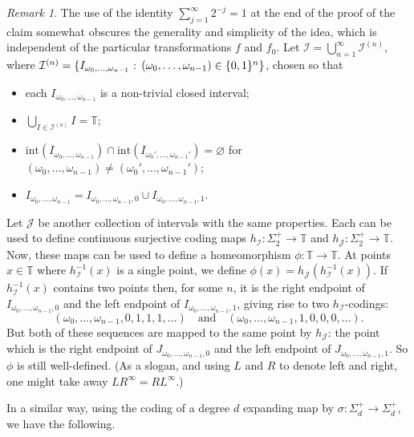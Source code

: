 \documentclass[12pt]{article}
\theoremstyle{definition}
\theoremstyle{remark}
\newtheorem{remark}[theorem]{Remark}
\begin{document}
\begin{remark}
The use of the identity $\sum_{j=1}^\infty 2^{-j} =1$ at the end of the proof of the claim somewhat obscures the generality and simplicity of the idea, which is independent of the particular transformations $f$ and $f_0$. Let $\mathcal I = \bigcup_{n=1}^\infty \mathcal I^{(n)}$, where
$\mathcal I^{(n)} = \{I_{\omega_0,\ldots,\omega_{n-1}} \hbox{ : } (\omega_0,\ldots,\omega_{n-1})
\in \{0,1\}^n\}$, chosen so that
\begin{itemize}
\item
each $I_{\omega_0,\ldots,\omega_{n-1}}$ is a non-trivial closed interval;
\item
$\bigcup_{I \in \mathcal I^{(n)}} I = \mathbb T$;
\item
$\mathrm{int}(I_{\omega_0,\ldots,\omega_{n-1}}) \cap \mathrm{int}(I_{\omega_0',\ldots,\omega_{n-1}'}) = \varnothing$ for $(\omega_0,\ldots,\omega_{n-1}) \ne (\omega_0',\ldots,\omega_{n-1}')$;
\item
$I_{\omega_0,\ldots,\omega_{n-1}} = I_{\omega_0,\ldots,\omega_{n-1},0} \cup I_{\omega_0,\ldots,\omega_{n-1},1}$.
\end{itemize}
Let $\mathcal J$ be another collection of intervals with the same properties. Each can be used to define continuous surjective coding maps $h_{\mathcal I} : \Sigma_2^+ \to \mathbb T$ 
and $h_{\mathcal J} : \Sigma_2^+ \to \mathbb T$. Now, these maps can be used to define a homeomorphism
$\phi : \mathbb T \to \mathbb T$. At points $x \in \mathbb T$ where $h_{\mathcal I}^{-1}(x)$ is a single point, we define $\phi(x) = h_{\mathcal J}(h_{\mathcal I}^{-1}(x))$. If $h_{\mathcal I}^{-1}(x)$
contains two points then, for some $n$, it is the right endpoint of 
$I_{\omega_0,\ldots,\omega_{n-1},0}$ and the left endpoint of
$I_{\omega_0,\ldots,\omega_{n-1},1}$, giving rise to two $h_{\mathcal I}$-codings:
\[
(\omega_0,\ldots,\omega_{n-1},0,1,1,1,\ldots) \quad
\mathrm{and} \quad
(\omega_0,\ldots,\omega_{n-1},1,0,0,0,\ldots).
\]
But both of these sequences are mapped to the same point by $h_{\mathcal J}$:
the point which is the right endpoint of 
$J_{\omega_0,\ldots,\omega_{n-1},0}$ and the left endpoint of
$J_{\omega_0,\ldots,\omega_{n-1},1}$. So $\phi$ is still well-defined.
(As a slogan, and using $L$ and $R$ to denote left and right, one might take away
$LR^\infty=RL^\infty$.)
\end{remark}

In a similar way, using the coding of a degree $d$ expanding map by $\sigma : \Sigma_d^+ \to \Sigma_d^+$, we have the following.
\end{document}
